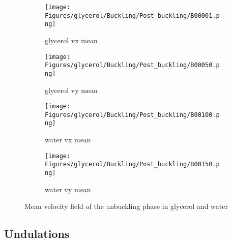 \documentclass[a4paper,10pt]{report}
\begin{document}
\begin{figure}[htbp]%
	\centering%
		\begin{subfigure}[h]{0.5\textwidth}%
					\texttt{[image: Figures/glycerol/Buckling/Post\_buckling/B00001.png]}%
					\caption{glycerol vx mean}%
					\label{fig:vxmeanglycerol}%
			\end{subfigure}%
			\begin{subfigure}[h]{0.5\linewidth}%
					\texttt{[image: Figures/glycerol/Buckling/Post\_buckling/B00050.png]}%
					\caption{glycerol vy mean}%
					\label{fig:vymeanglycerol}%
			\end{subfigure}%
			
			\begin{subfigure}[h]{0.5\textwidth}%
					\texttt{[image: Figures/glycerol/Buckling/Post\_buckling/B00100.png]}%
					\caption{water vx mean}%
					\label{fig:vxmeanwater}%
			\end{subfigure}%
			\begin{subfigure}[h]{0.5\linewidth}%
					\texttt{[image: Figures/glycerol/Buckling/Post\_buckling/B00150.png]}%
					\caption{water vy mean}%
					\label{fig:vymeanwater}%
			\end{subfigure}%
		\caption{Mean velocity field of the unbuckling phase in glycerol and water}
		\label{fig:Meanvelocityfieldoftheunbucklingphaseinglycerolandwater}%
\end{figure}
 
\subsection{Undulations}
\end{document}
